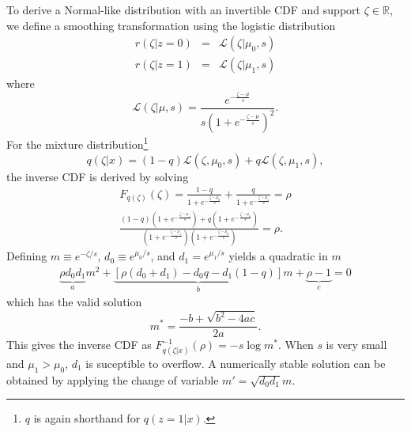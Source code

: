 \documentclass{article}
\begin{document}
To derive a Normal-like distribution with an invertible CDF and support $\zeta\in \mathbb{R}$, 
we define a smoothing transformation using the logistic distribution
\begin{eqnarray*}
r(\zeta | z = 0) &=& \mathcal{L}(\zeta | \mu_0, s)\\
r(\zeta | z = 1) &=& \mathcal{L}(\zeta | \mu_1, s) 
\end{eqnarray*}
where
\begin{equation*}
 \mathcal{L}(\zeta | \mu, s) = \frac{e^{- \frac{\zeta - \mu}{s}}}{s (1 + e^{- \frac{\zeta - \mu}{s}})^2}.
\end{equation*}
For the mixture distribution\footnote{$q$ is again shorthand for $q(z=1|x)$.}
\begin{equation*}
 q(\zeta | x) = (1 - q) \mathcal{L}(\zeta, \mu_0, s) + q \mathcal{L}(\zeta, \mu_1, s),
\end{equation*}
the inverse CDF is derived by solving
\begin{eqnarray*}
 F_{q(\zeta)}(\zeta) = \frac{1-q}{1 + e^{ - \frac{\zeta - \mu_0}{s}} } + \frac{q}{1 + e^{ - \frac{\zeta - \mu_1}{s} }} = \rho \\
 \frac{  (1 - q)(1 + e^{ - \frac{\zeta - \mu_1}{s}})  + q(1 + e^{ - \frac{\zeta - \mu_0}{s}}) }{ (1 + e^{ - \frac{\zeta - \mu_1}{s}})  (1 + e^{ - \frac{\zeta - \mu_0}{s}}) } = \rho.
\end{eqnarray*}
Defining $m \equiv e^{-\zeta/s}$, $d_0 \equiv e^{\mu_0/s}$, and $d_1=e^{\mu_1/s}$ yields a quadratic in $m$
\begin{eqnarray*}
\underbrace{\rho d_0 d_1}_a m^2 + \underbrace{[\rho(d_0 + d_1) - d_0 q - d_1 (1-q)]}_bm + \underbrace{\rho - 1}_c = 0
\end{eqnarray*}
which has the valid solution
\begin{equation*}
 m^* = \frac{-b + \sqrt{b^2 - 4ac}}{2a}.
\end{equation*}
This gives the inverse CDF as $F^{-1}_{q(\zeta|x)}(\rho) = -s \log{m^*}$. When $s$ is very small and $\mu_1 > \mu_0$, 
$d_1$ is suceptible to overflow. A numerically stable solution can be obtained by applying the change of variable $m'=\sqrt{d_0d_1}m$.
\end{document}
